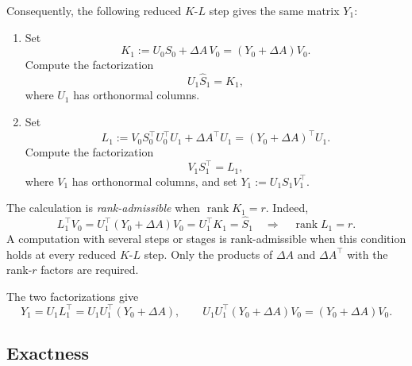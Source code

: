 \documentclass[]{article}
\numberwithin{equation}{section}
\theoremstyle{plain}
\theoremstyle{remark}
\numberwithin{algorithm}{section}
\newcommand{\rank}{\operatorname{rank}}
\begin{document}
Consequently, the following reduced \(K\)-\(L\) step gives the same matrix
\(Y_1\):
\begin{enumerate}
\item Set
\begin{equation}\label{eq:two-factor-k}
 K_1:=U_0S_0+\Delta A\,V_0=(Y_0+\Delta A)V_0.
\end{equation}
Compute the factorization
\begin{equation}\label{eq:two-factor-k-factor}
 U_1\widehat S_1=K_1,
\end{equation}
where \(U_1\) has orthonormal columns.

\item Set
\begin{equation}\label{eq:two-factor-l}
 L_1:=V_0S_0^\top U_0^\top U_1+\Delta A^\top U_1
     =(Y_0+\Delta A)^\top U_1.
\end{equation}
Compute the factorization
\begin{equation}\label{eq:two-factor-l-factor}
 V_1S_1^\top=L_1,
\end{equation}
where \(V_1\) has orthonormal columns, and set
\(Y_1:=U_1S_1V_1^\top\).
\end{enumerate}
The calculation is \emph{rank-admissible} when \(\rank K_1=r\).
Indeed,
\begin{equation}\label{eq:second-factor-rank}
 L_1^\top V_0
 =U_1^\top(Y_0+\Delta A)V_0
 =U_1^\top K_1
 =\widehat S_1
 \quad\Longrightarrow\quad \rank L_1=r.
\end{equation}
A computation with several steps or stages is rank-admissible when this
condition holds at every reduced \(K\)-\(L\) step.  Only the products of \(\Delta A\)
and \(\Delta A^\top\) with the rank-\(r\) factors are required.

The two factorizations give
\begin{equation}\label{eq:ksl-old-row-identities}
 Y_1=U_1L_1^\top=U_1U_1^\top(Y_0+\Delta A),
 \qquad U_1U_1^\top(Y_0+\Delta A)V_0=(Y_0+\Delta A)V_0.
\end{equation}

\subsection{Exactness}
\label{sec:exactness}
\end{document}
